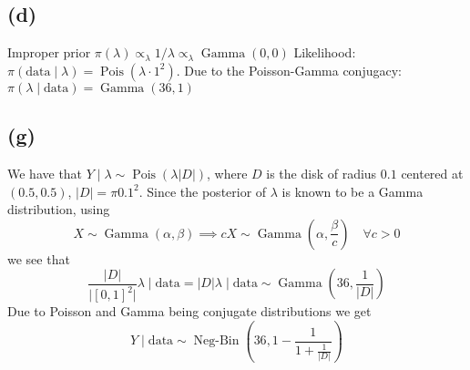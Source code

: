 \documentclass{article}
\DeclareMathOperator\Poisson{Pois}
\DeclareMathOperator\GammaDist{Gamma}
\DeclareMathOperator\NegBin{Neg-Bin}
\newcommand{\size}[1]{\lvert #1 \rvert}
\begin{document}
\subsection{(d)}
Improper prior $\pi(\lambda) \propto_\lambda 1/\lambda \propto_\lambda \GammaDist(0, 0)$
Likelihood: $\pi(\text{data} \mid \lambda) = \Poisson(\lambda \cdot 1^2)$.
Due to the Poisson-Gamma conjugacy: $\pi(\lambda \mid \text{data}) = \GammaDist(36, 1)$

\subsection{(g)}
We have that $Y \mid \lambda \sim \Poisson(\lambda \lvert D \rvert)$,
where $D$ is the disk of radius $0.1$ centered at $(0.5, 0.5)$,
$\lvert D \rvert = \pi 0.1^2$.
Since the posterior of $\lambda$ is known to be a Gamma distribution, using
$$ X \sim \GammaDist(\alpha, \beta) \implies cX \sim \GammaDist(\alpha, \frac\beta c) \quad \forall c>0 $$
we see that
$$ \frac{\size{D}}{\size{[0, 1]^2}} \lambda \mid \text{data} = \size{D} \lambda \mid \text{data}
\sim \GammaDist(36, \frac1{\size{D}}) $$
Due to Poisson and Gamma being conjugate distributions we get
$$ Y \mid \text{data} \sim \NegBin(36, 1 - \frac1{1 + \frac1{\size{D}}}) $$

\begin{comment}
	\appendix
	\section{Appendix, R code}
	
\end{comment}
\end{document}
